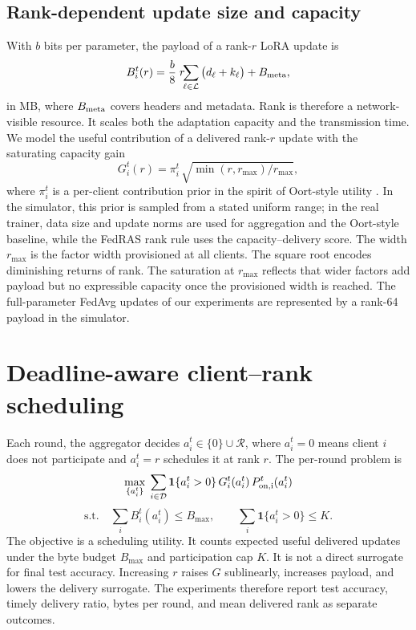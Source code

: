 \documentclass[preprint,12pt]{elsarticle}
\begin{document}
\subsection{Rank-dependent update size and capacity}
With $b$ bits per parameter, the payload of a rank-$r$ LoRA update is
\begin{equation}
B_i^t(r)=\frac{b}{8}\;r\!\!\sum_{\ell\in\mathcal L}\big(d_\ell+k_\ell\big)+B_{\rm meta},
\label{eq:size}
\end{equation}
in MB, where $B_{\rm meta}$ covers headers and metadata. Rank is therefore a network-visible resource. It scales both the adaptation capacity and the transmission time. We model the useful contribution of a delivered rank-$r$ update with the saturating capacity gain
\begin{equation}
G_i^t(r)=\pi_i^t\,\sqrt{\min(r,r_{\max})/r_{\max}},
\label{eq:cap}
\end{equation}
where $\pi_i^t$ is a per-client contribution prior in the spirit of Oort-style utility \cite{oort2021oort}. In the simulator, this prior is sampled from a stated uniform range; in the real trainer, data size and update norms are used for aggregation and the Oort-style baseline, while the FedRAS rank rule uses the capacity--delivery score. The width $r_{\max}$ is the factor width provisioned at all clients. The square root encodes diminishing returns of rank. The saturation at $r_{\max}$ reflects that wider factors add payload but no expressible capacity once the provisioned width is reached. The full-parameter FedAvg updates of our experiments are represented by a rank-64 payload in the simulator.

\section{Deadline-aware client--rank scheduling}
\label{sec:problem}

Each round, the aggregator decides $a_i^t\in\{0\}\cup\mathcal R$, where $a_i^t=0$ means client $i$ does not participate and $a_i^t=r$ schedules it at rank $r$. The per-round problem is
\begin{equation}
\max_{\{a_i^t\}}\;\sum_{i\in\mathcal D}\mathbf 1\{a_i^t>0\}\,G_i^t(a_i^t)\,P_{\rm on,i}^t(a_i^t)
\label{eq:objective}
\end{equation}
\begin{equation}
\text{s.t.}\quad \sum_i B_i^t(a_i^t)\le B_{\max},\qquad \sum_i\mathbf 1\{a_i^t>0\}\le K .
\label{eq:constraints}
\end{equation}
The objective is a scheduling utility. It counts expected useful delivered updates under the byte budget $B_{\max}$ and participation cap $K$. It is not a direct surrogate for final test accuracy. Increasing $r$ raises $G$ sublinearly, increases payload, and lowers the delivery surrogate. The experiments therefore report test accuracy, timely delivery ratio, bytes per round, and mean delivered rank as separate outcomes.
\end{document}

